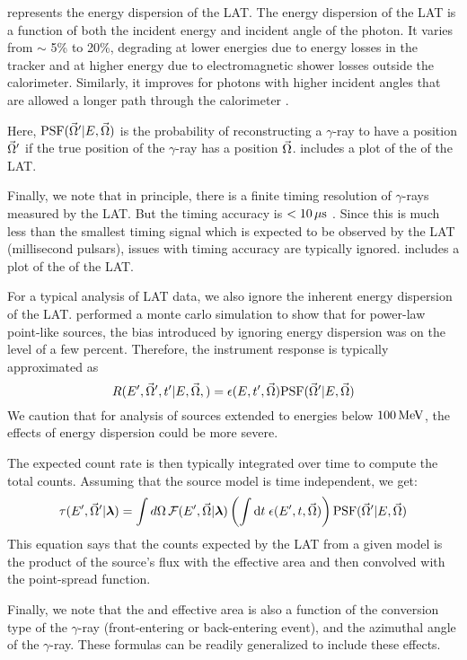 \edisp represents the energy dispersion of the \ac{LAT}. The energy dispersion
of the \ac{LAT} is a function of both the incident energy and incident angle
of the photon. It varies from $\sim$ 5\% to 20\%, degrading at lower
energies due to energy losses in the tracker and at higher energy due
to electromagnetic shower losses outside the calorimeter. Similarly,
it improves for photons with higher incident angles that are allowed a
longer path through the calorimeter \citep{ackermann_2012a_fermi-large}.

Here, $\text{PSF}(\vec\Omega'|E,\vec\Omega)$ is the probability of
reconstructing a $\gamma$-ray to have a position $\vec\Omega'$ if
the true position of the $\gamma$-ray has a position $\vec\Omega$.
 includes a plot of the \psf of the \ac{LAT}.

Finally, we note that in principle, there is a finite timing resolution
of $\gamma$-rays measured by the \ac{LAT}. But the timing accuracy is
$<10\,\mu\text{s}$ \citep{atwood_2009a_large-telescope}. Since
this is much less than the smallest timing signal which is expected to
be observed by the \ac{LAT} (millisecond pulsars), issues with timing
accuracy are typically ignored.   includes
a plot of the \edisp of the \ac{LAT}.

For a typical analysis of \ac{LAT} data, we also ignore the inherent
energy dispersion of the \ac{LAT}.  \cite{ackermann_2012a_fermi-large}
performed a monte carlo simulation to show that for power-law point-like
sources, the bias introduced by ignoring energy dispersion was on the
level of a few percent.  Therefore, the instrument response is typically
approximated as
\begin{equation}
  R(E',\vec\Omega',t'|E,\vec\Omega,) = 
  \epsilon(E,t',\vec\Omega) \text{PSF}(\vec\Omega'|E,\vec\Omega)
\end{equation}
We caution that for analysis of sources extended to energies below
$100\,\text{MeV}$, the effects of energy dispersion could be more
severe.

The expected count rate is then typically integrated over time to compute
the total counts. Assuming that the source model is time independent,
we get:
\begin{equation}\eqnlabel{differential_model_counts}
  \eventrate(\energy',\solidangle'|\modelparams)
  = \int \dsolidangle \,
  \fluxdensity(\energy',\vec\Omega|\modelparams) 
\left(
\int \dtime \intspace \effectivearea(\energy',\time,\solidangle) 
\right)
\psf(\solidangle'|E,\solidangle)
\end{equation}
This equation says that the counts expected by the \ac{LAT} from a given
model is the product of the source's flux with the effective area and
then convolved with the point-spread function.

Finally, we note that the \psf and effective area is also a function of
the conversion type of the $\gamma$-ray (front-entering or back-entering
event), and the azimuthal angle of the $\gamma$-ray. These formulas can
be readily generalized to include these effects.
